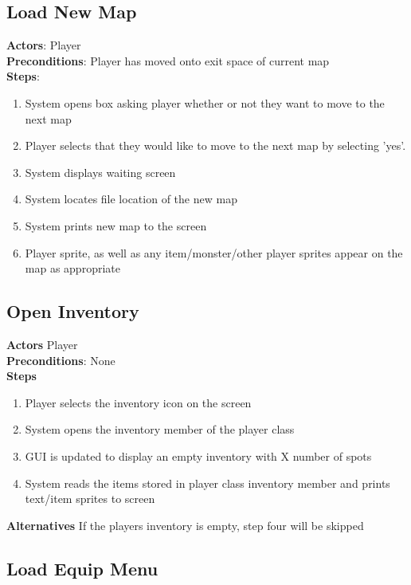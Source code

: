 \documentclass{report}
\begin{document}
\subsection{Load New Map}

\textbf{Actors}:
Player \\
\textbf{Preconditions}:
Player has moved onto exit space of current map \\
\textbf{Steps}:
\begin{enumerate}
\item System opens box asking player whether or not they want to move to the next map
\item Player selects that they would like to move to the next map by selecting 'yes'.
\item System displays waiting screen
\item System locates file location of the new map
\item System prints new map to the screen
\item Player sprite, as well as any item/monster/other player sprites appear on the map as appropriate
\end{enumerate}


\subsection{Open Inventory}

\textbf{Actors}
Player \\
\textbf{Preconditions}:
None \\
\textbf{Steps}
\begin{enumerate}
\item Player selects the inventory icon on the screen
\item System opens the inventory member of the player class
\item GUI is updated to display an empty inventory with X number of spots
\item System reads the items stored in player class inventory member and prints text/item sprites to screen
\end{enumerate}
\textbf{Alternatives}
If the players inventory is empty, step four will be skipped \\

\subsection{Load Equip Menu}
\end{document}
